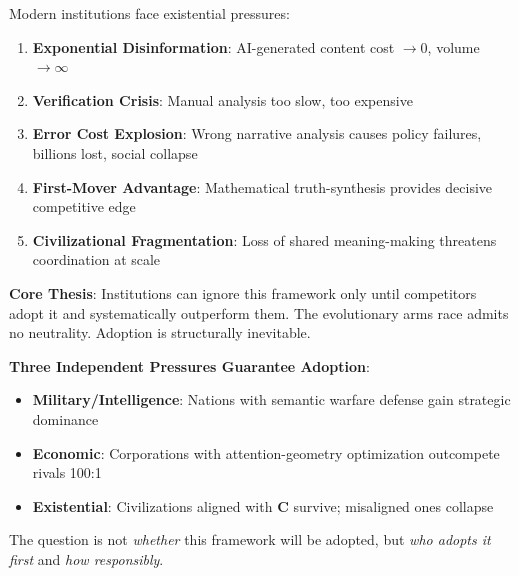 \documentclass[11pt,a4paper]{article}
\theoremstyle{definition}
\theoremstyle{remark}
\begin{document}
\begin{small}
Modern institutions face existential pressures:

\begin{enumerate}[label=\textbf{\arabic*.}, leftmargin=*]
\item \textbf{Exponential Disinformation}: AI-generated content cost \(\rightarrow 0\), volume \(\rightarrow \infty\)
\item \textbf{Verification Crisis}: Manual analysis too slow, too expensive
\item \textbf{Error Cost Explosion}: Wrong narrative analysis causes policy failures, billions lost, social collapse
\item \textbf{First-Mover Advantage}: Mathematical truth-synthesis provides decisive competitive edge
\item \textbf{Civilizational Fragmentation}: Loss of shared meaning-making threatens coordination at scale
\end{enumerate}

\begin{mdframed}[backgroundcolor=red!5,linewidth=2pt]
\textbf{Core Thesis}: Institutions can ignore this framework only until competitors adopt it and systematically outperform them. The evolutionary arms race admits no neutrality. Adoption is structurally inevitable.

\vspace{0.5em}

\textbf{Three Independent Pressures Guarantee Adoption}:
\begin{itemize}[nosep]
    \item \textbf{Military/Intelligence}: Nations with semantic warfare defense gain strategic dominance
    \item \textbf{Economic}: Corporations with attention-geometry optimization outcompete rivals 100:1
    \item \textbf{Existential}: Civilizations aligned with \(\mathbf{C}\) survive; misaligned ones collapse
\end{itemize}

The question is not \textit{whether} this framework will be adopted, but \textit{who adopts it first} and \textit{how responsibly}.
\end{mdframed}

\begin{figure}[H]
\centering
{}
\end{figure}
\end{small}
\end{document}
